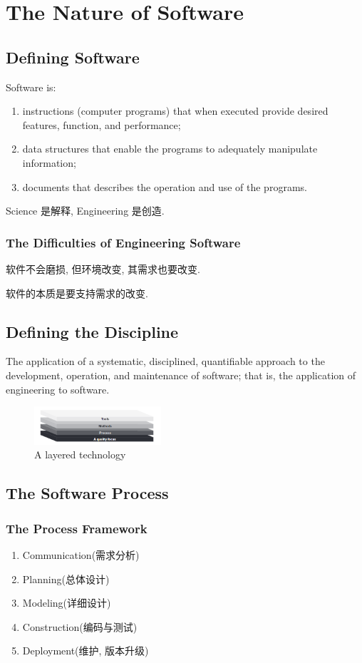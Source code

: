 \newpage
\section{The Nature of Software}
\subsection{Defining Software}
Software is: 
\begin{enumerate}
    \item instructions (computer programs) that when executed provide desired features, function, and performance; 
    \item data structures that enable the programs to adequately manipulate information; 
    \item documents that describes the operation and use of the programs.
\end{enumerate}

Science 是解释,  Engineering 是创造.

\subsubsection{The Difficulties of Engineering Software}
软件不会磨损, 但环境改变, 其需求也要改变.

软件的本质是要支持需求的改变.

\subsection{Defining the Discipline}
The application of a systematic, disciplined, quantifiable approach
to the development, operation, and maintenance of software; that is, the application of engineering to software.


\begin{figure}[!htb]
    \centering
    \includegraphics[width=0.42\textwidth]{pic/SE1/A layered technology}
    \caption{A layered technology}
\end{figure}


\subsection{The Software Process}
\subsubsection{The Process Framework}
\begin{enumerate}
    \item Communication(需求分析)
    \item Planning(总体设计)
    \item Modeling(详细设计)
    \item Construction(编码与测试)
    \item Deployment(维护, 版本升级)
\end{enumerate}


